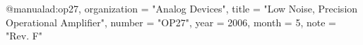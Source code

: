  @manual{ad:op27,
  organization  = "Analog Devices",
  title         = "Low Noise, Precision Operational Amplifier",
  number        = "OP27",
  year          =  2006,
  month         =  5,
  note          = "Rev. F"
 }
